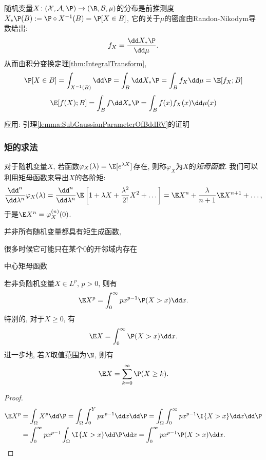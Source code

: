 \begin{example}[分布的密度]
	随机变量$X \colon (\cX, \cA, \P) \to (\R, \cB, \mu)$的分布是前推测度$X_* \P (B) := \P \circ X^{-1} (B) = \P[X \in B]$, 它的关于$\mu$的密度由Randon-Nikodym导数给出: 
	\begin{equation*}
		f_X = \frac{\dd X_* \P}{\dd \mu}. 
	\end{equation*}
	从而由积分变换定理\ref{thm:IntegralTransform}, 
	\begin{equation*}
		\P[X \in B] 
		= \int_{X^{-1}(B)} \dd \P 
		= \int_B \dd X_* \P 
		= \int_B f_X \dd \mu
		= \E[f_X; B]
	\end{equation*}
	\begin{equation*}
		\E[f(X); B]
		= \int_B f \dd X_* \P 
		= \int_B f(x) f_X(x) \dd \mu(x)
	\end{equation*}
\end{example}

应用: 引理\ref{lemma:SubGaussianParameterOfBddRV}的证明

\subsubsection{矩的求法}

对于随机变量$X$, 若函数$\varphi_X(\lambda) = \E[e^{\lambda X}]$存在, 则称$\varphi_X$为$X$的\emph{矩母函数}.
我们可以利用矩母函数来导出$X$的各阶矩: 
\begin{equation*}
	\frac{\dd^n}{\dd \lambda^n} \varphi_X(\lambda)
	= \frac{\dd^n}{\dd \lambda^n} \E \left[ 1 + \lambda X + \frac{\lambda^2}{2!} X^2 + \dots \right]
	= \E X^n + \frac{\lambda}{n + 1} \E X^{n+1} + \dots, 
\end{equation*}
于是$\E X^n = \varphi_X^{(n)}(0)$. 

并非所有随机变量都具有矩生成函数, 

很多时候它可能只在某个$0$的开邻域内存在

中心矩母函数


\begin{lemma}\label{lemma:trickOfExpectation}
	若非负随机变量$X \in L^p$, $p > 0$, 则有
	\begin{equation}
		\E X^p = \int_0^{\infty} p x^{p-1} \P(X > x) \dd x. 
	\end{equation}
	特别的, 对于$X \geq 0$, 有
	\begin{equation*}
		\E X = \int_0^{\infty} \P(X > x) \dd x. 
	\end{equation*}
	进一步地, 若$X$取值范围为$\N$, 则有
	\begin{equation*}
		\E X = \sum_{k=0}^{\infty} \P(X \geq k). 
	\end{equation*}
\end{lemma}
\begin{proof}
	\begin{align*}
		\E X^p 
		&= \int_\Omega X^p \dd \P 
		= \int_\Omega \int_0^Y p x^{p-1} \dd x \dd \P 
		= \int_\Omega \int_0^{\infty} p x^{p-1} \I{X > x} \dd x \dd \P \\
		&= \int_0^{\infty} p x^{p-1} \int_\Omega \I{X > x} \dd \P \dd x
		= \int_0^{\infty} p x^{p-1} \P(X > x) \dd x.
	\end{align*}
\end{proof}


